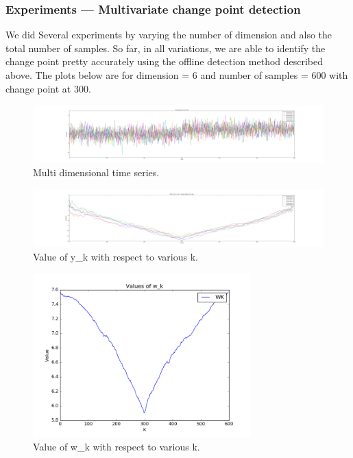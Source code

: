 \documentclass{article}
\begin{document}
\subsubsection{Experiments --- Multivariate change point detection}
We did Several experiments by varying the number of dimension and also the total number of samples.  So far, in all variations, we are able to identify the change point pretty accurately using the offline detection method described above.  The plots below are for dimension = 6 and number of samples = 600 with change point at 300.

\begin{figure}[ht!]
  \centering
  \includegraphics[width=1\textwidth]{images/rd_offline/ts}
  \caption{Multi dimensional time series.\label{fig:rd_ts}}
\end{figure}

\begin{figure}[ht!]
  \centering
  \includegraphics[width=1\textwidth]{images/rd_offline/y_k}
  \caption{Value of y\_k with respect to various k.\label{fig:rd_y_k}}
\end{figure}

\begin{figure}[ht!]
  \centering
  \includegraphics[width=0.75\textwidth]{images/rd_offline/w_k}
  \caption{Value of w\_k with respect to various k.\label{fig:rd_w_k}}
\end{figure}
\end{document}
